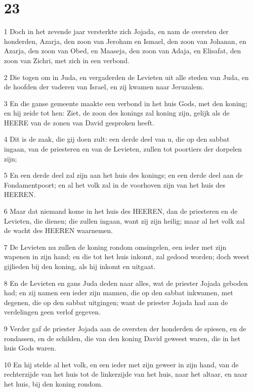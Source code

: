 \chapter{23}

\par 1 Doch in het zevende jaar versterkte zich Jojada, en nam de oversten der honderden, Azarja, den zoon van Jeroham en Ismael, den zoon van Johanan, en Azarja, den zoon van Obed, en Maaseja, den zoon van Adaja, en Elisafat, den zoon van Zichri, met zich in een verbond.
\par 2 Die togen om in Juda, en vergaderden de Levieten uit alle steden van Juda, en de hoofden der vaderen van Israel, en zij kwamen naar Jeruzalem.
\par 3 En die ganse gemeente maakte een verbond in het huis Gods, met den koning; en hij zeide tot hen: Ziet, de zoon des konings zal koning zijn, gelijk als de HEERE van de zonen van David gesproken heeft.
\par 4 Dit is de zaak, die gij doen zult: een derde deel van u, die op den sabbat ingaan, van de priesteren en van de Levieten, zullen tot poortiers der dorpelen zijn;
\par 5 En een derde deel zal zijn aan het huis des konings; en een derde deel aan de Fondamentpoort; en al het volk zal in de voorhoven zijn van het huis des HEEREN.
\par 6 Maar dat niemand kome in het huis des HEEREN, dan de priesteren en de Levieten, die dienen; die zullen ingaan, want zij zijn heilig; maar al het volk zal de wacht des HEEREN waarnemen.
\par 7 De Levieten nu zullen de koning rondom omsingelen, een ieder met zijn wapenen in zijn hand; en die tot het huis inkomt, zal gedood worden; doch weest gijlieden bij den koning, als hij inkomt en uitgaat.
\par 8 En de Levieten en gans Juda deden naar alles, wat de priester Jojada geboden had; en zij namen een ieder zijn mannen, die op den sabbat inkwamen, met degenen, die op den sabbat uitgingen; want de priester Jojada had aan de verdelingen geen verlof gegeven.
\par 9 Verder gaf de priester Jojada aan de oversten der honderden de spiesen, en de rondassen, en de schilden, die van den koning David geweest waren, die in het huis Gods waren.
\par 10 En hij stelde al het volk, en een ieder met zijn geweer in zijn hand, van de rechterzijde van het huis tot de linkerzijde van het huis, naar het altaar, en naar het huis, bij den koning rondom.
